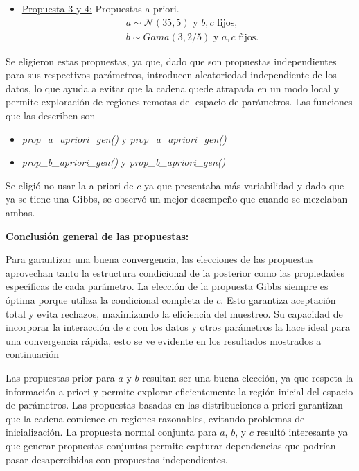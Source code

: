 \begin{itemize}
	\item \underline{Propuesta 3 y 4:} Propuestas a priori.
	\begin{equation} \label{eq:26}
		\begin{aligned}
			&a\sim \mathcal{N}(35,5) \text{ y } b, c \text{ fijos},\\
			&b\sim Gama(3, 2/5) \text{ y } a, c \text{ fijos}.
		\end{aligned}
	\end{equation}
\end{itemize}
Se eligieron estas propuestas, ya que, dado que son propuestas independientes para sus respectivos parámetros, introducen aleatoriedad independiente de los datos, lo que ayuda a evitar que la cadena quede atrapada en un modo local y permite exploración de regiones remotas del espacio de parámetros. Las funciones que las describen son
\begin{itemize}
	\item \textit{prop\_a\_apriori\_gen()} y \textit{prop\_a\_apriori\_gen()}
	\item \textit{prop\_b\_apriori\_gen()} y \textit{prop\_b\_apriori\_gen()}
\end{itemize}
Se eligió no usar la a priori de $c$ ya que presentaba más variabilidad y dado que ya se tiene una Gibbs, se observó un mejor desempeño que cuando se mezclaban ambas.

\textbf{Conclusión general de las propuestas:}

Para garantizar una buena convergencia, las elecciones de las propuestas aprovechan tanto la estructura condicional de la posterior como las propiedades específicas de cada parámetro. La elección de la propuesta Gibbs siempre es óptima porque utiliza la condicional completa de $c$. Esto garantiza aceptación total y evita rechazos, maximizando la eficiencia del muestreo. Su capacidad de incorporar la interacción de $c$ con los datos y otros parámetros la hace ideal para una convergencia rápida, esto se ve evidente en los resultados mostrados a continuación

Las propuestas prior para $a$ y $b$ resultan ser una buena elección, ya que respeta la información a priori y permite explorar eficientemente la región inicial del espacio de parámetros. Las propuestas basadas en las distribuciones a priori garantizan que la cadena comience en regiones razonables, evitando problemas de inicialización. La propuesta normal conjunta para $a$, $b$, y $c$ resultó interesante ya que generar propuestas conjuntas permite capturar dependencias que podrían pasar desapercibidas con propuestas independientes.

